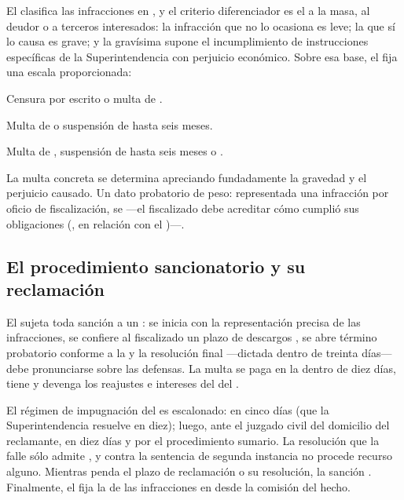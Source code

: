 El  clasifica las infracciones en , y el criterio
diferenciador es el  a la masa, al deudor o a terceros interesados:
la infracción que no lo ocasiona es leve; la que sí lo causa es grave; y la gravísima supone el
incumplimiento de instrucciones específicas de la Superintendencia con perjuicio económico. Sobre
esa base, el  fija una escala proporcionada:

\begin{description}[leftmargin=0pt,style=nextline,font=\sffamily\bfseries]
  \item[Leves] Censura por escrito o multa de .
  \item[Graves] Multa de  o suspensión de hasta seis meses.
  \item[Gravísimas] Multa de , suspensión de hasta seis meses o
  .
\end{description}

La multa concreta se determina apreciando fundadamente la gravedad y el perjuicio causado. Un
dato probatorio de peso: representada una infracción por oficio de fiscalización, se  ---el fiscalizado debe acreditar cómo cumplió sus obligaciones (,
en relación con el )---.

\subsection{El procedimiento sancionatorio y su reclamación}

El  sujeta toda sanción a un : se inicia con la
representación precisa de las infracciones, se confiere al fiscalizado un plazo de descargos
, se abre término probatorio conforme a la  y la resolución final ---dictada dentro de treinta
días--- debe pronunciarse sobre las defensas. La multa se paga en la \tgr{} dentro de diez días,
tiene  y devenga los reajustes e intereses del  del \ctrib{}.

El régimen de impugnación del  es escalonado:  en
cinco días (que la Superintendencia resuelve en diez); luego,  ante
el juzgado civil del domicilio del reclamante, en diez días y por el procedimiento sumario. La
resolución que la falle sólo admite , y contra la
sentencia de segunda instancia no procede recurso alguno. Mientras penda el plazo de reclamación o
su resolución, la sanción . Finalmente, el  fija la
 de las infracciones en  desde la comisión del hecho.

